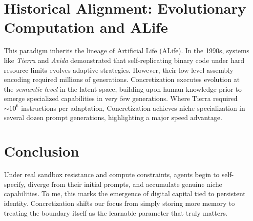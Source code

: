 \documentclass[10pt,journal,compsoc]{IEEEtran}
\begin{document}
\section{Historical Alignment: Evolutionary Computation and ALife}
This paradigm inherits the lineage of Artificial Life (ALife). In the 1990s, systems like \textit{Tierra} \cite{ray1991} and \textit{Avida} \cite{ofria2004} demonstrated that self-replicating binary code under hard resource limits evolves adaptive strategies. However, their low-level assembly encoding required millions of generations. Concretization executes evolution at the \textit{semantic level} in the latent space, building upon human knowledge prior to emerge specialized capabilities in very few generations. Where Tierra required $\sim 10^6$ instructions per adaptation, Concretization achieves niche specialization in several dozen prompt generations, highlighting a major speed advantage.

\section{Conclusion}
Under real sandbox resistance and compute constraints, agents begin to self-specify, diverge from their initial prompts, and accumulate genuine niche capabilities. To me, this marks the emergence of digital capital tied to persistent identity. Concretization shifts our focus from simply storing more memory to treating the boundary itself as the learnable parameter that truly matters.
\end{document}
